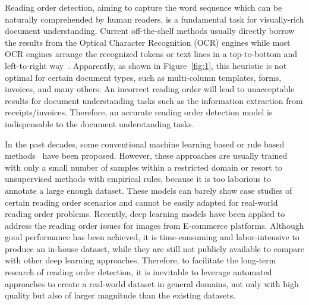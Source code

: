 Reading order detection, aiming to capture the word sequence which can be naturally comprehended by human readers, is a fundamental task for visually-rich document understanding. 
Current off-the-shelf methods usually directly borrow the results from the Optical Character Recognition (OCR) engines \cite{10.1145/3394486.3403172} while most OCR engines arrange the recognized tokens or text lines in a top-to-bottom and left-to-right way~\cite{6628706}.
Apparently, as shown in Figure~\ref{fig:1}, this heuristic is not optimal for certain document types, such as multi-column templates, forms, invoices, and many others. 
An incorrect reading order will lead to unacceptable results for document understanding tasks such as the information extraction from receipts/invoices. Therefore, an accurate reading order detection model is indispensable to the document understanding tasks.





In the past decades,  some conventional machine learning based or rule based methods~\cite{aiello2003bidimensional,4377050,malerba2007learning,malerba2008machine,10.1145/2644866.2644883} have been proposed.
However, 
these approaches are usually trained with only a small number of samples within a restricted domain or resort to unsupervised methods with empirical rules, because it is too laborious to annotate a large enough dataset.
These models can barely show case studies of certain reading order scenarios and cannot be easily adapted for real-world reading order problems. 
Recently, deep learning models \cite{10.1007/978-3-030-58595-2_6} have been applied to address the reading order issues for images from E-commerce platforms. Although good performance has been achieved, it is time-consuming and labor-intensive to produce an in-house dataset, while they are still not publicly available to compare with other deep learning approaches. Therefore, to facilitate the long-term research of reading order detection, it is inevitable to leverage automated approaches to create a real-world dataset in general domains, not only with high quality but also of larger magnitude than the existing datasets.




\begin{figure*}[htbp]
\centering
{}
\caption{Document image examples in ReadingBank with the reading order information. The colored areas show the paragraph-level reading order.}
\label{fig:1}
\end{figure*}

